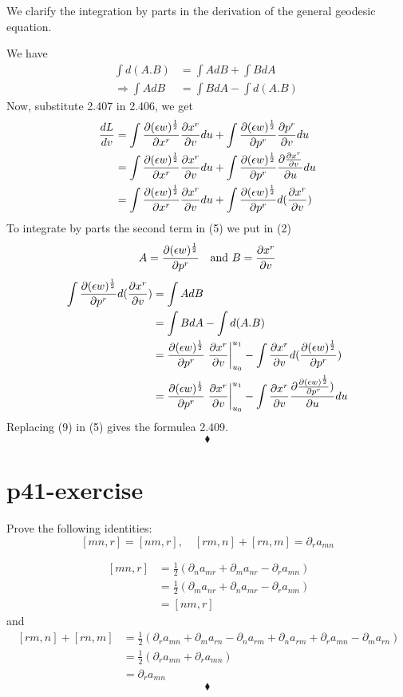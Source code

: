 \begin{tcolorbox}
We clarify the integration by parts in the derivation of the general  geodesic equation.
\end{tcolorbox}
We have 
\begin{align}
\int d(A.B) &= \int AdB + \int BdA\\
\Rightarrow  \int AdB &= \int BdA -  \int d(A.B)\
\end{align}
Now, substitute 2.407 in 2.406, we get
\begin{align}
\dv{L}{v} &= \int \pdv{(\epsilon w)^{\frac{1}{2}}}{x^r} \pdv{x^r}{v} du +  \int \pdv{(\epsilon w)^{\frac{1}{2}}}{p^r} \pdv{p^r}{v} du\\
\ &= \int \pdv{(\epsilon w)^{\frac{1}{2}}}{x^r} \pdv{x^r}{v} du +  \int \pdv{(\epsilon w)^{\frac{1}{2}}}{p^r} \pdv{\pdv{x^r}{v}}{u} du\\
&= \int \pdv{(\epsilon w)^{\frac{1}{2}}}{x^r} \pdv{x^r}{v} du +  \int \pdv{(\epsilon w)^{\frac{1}{2}}}{p^r} d(\pdv{x^r}{v})
\end{align}
To integrate by parts the second term in (5) we put in (2)
$$A= \pdv{(\epsilon w)^{\frac{1}{2}}}{p^r} \quad \text{and } B = \pdv{x^r}{v}$$
\begin{align}
\int \pdv{(\epsilon w)^{\frac{1}{2}}}{p^r} d(\pdv{x^r}{v}) &= \int AdB \\
\ & = \int BdA -  \int d(A.B)\\
\ &= \pdv{(\epsilon w)^{\frac{1}{2}}}{p^r}\left.\pdv{x^r}{v}\right|_{u_0}^{u_1} - \int \pdv{x^r}{v}d(\pdv{(\epsilon w)^{\frac{1}{2}}}{p^r} )\\
\ &= \pdv{(\epsilon w)^{\frac{1}{2}}}{p^r}\left.\pdv{x^r}{v}\right|_{u_0}^{u_1} - \int \pdv{x^r}{v}\pdv{\pdv{(\epsilon w)^{\frac{1}{2}}}{p^r} )}{u}du
\end{align}
Replacing (9) in (5) gives the formulea 2.409.
$$\blacklozenge$$
\newpage

\section{p41-exercise}
\begin{tcolorbox}
Prove the following identities: $$ [mn,r] = [nm,r], \quad [rm,n]+[rn,m] = \partial_r a_{mn}$$
\end{tcolorbox}
\begin{align}
\ [mn,r] &= \frac{1}{2}(\partial_{n} a_{mr}+ \partial_{m} a_{nr} - \partial_{r} a_{mn})\\
\ &= \frac{1}{2}(\partial_{m} a_{nr} + \partial_{n} a_{mr}  - \partial_{r} a_{nm})\\
\ &=[nm,r] 
\end{align}
and 
\begin{align}
\ [rm,n] + [rn,m]&= \frac{1}{2}(\partial_{r} a_{mn}+ \partial_{m} a_{rn} - \partial_{n} a_{rm} + \partial_{n} a_{rm}+ \partial_{r} a_{mn} - \partial_{m} a_{rn})\\
\ &= \frac{1}{2}(\partial_{r} a_{mn}+\partial_{r} a_{mn})\\
\ &=\partial_{r} a_{mn}
\end{align}
$$\blacklozenge$$
\newpage

